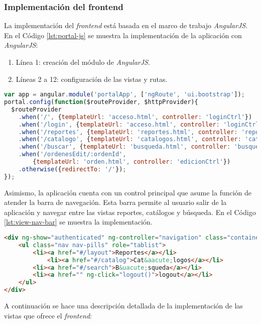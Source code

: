 \subsubsection{Implementación del frontend}\label{sec:frontend}
La implementación del \textit{frontend} está basada en el marco de trabajo \textit{AngularJS}. En el Código \ref{lst:portal-js} se muestra la implementación de la aplicación con \textit{AngularJS}:
\begin{enumerate}
	\item Línea 1: creación del módulo de \textit{AngularJS}.
	\item Líneas 2 a 12: configuración de las vistas y rutas.
\end{enumerate}
\begin{lstlisting}[language=Javascript, caption={Módulo de \textit{AngularJS} para el Portal Web.}, captionpos=b, label={lst:portal-js}]
var app = angular.module('portalApp', ['ngRoute', 'ui.bootstrap']);
portal.config(function($routeProvider, $httpProvider){
  $routeProvider
	.when('/', {templateUrl: 'acceso.html', controller: 'loginCtrl'})
	.when('/login', {templateUrl: 'acceso.html', controller: 'loginCtrl'})
	.when('/reportes', {templateUrl: 'reportes.html', controller: 'reportesCtrl'})
	.when('/catalogo', {templateUrl: 'catalogos.html', controller: 'catalogosCtrl'})
	.when('/buscar', {templateUrl: 'busqueda.html', controller: 'busquedaCtrl'})
	.when('/ordenesEdit/:ordenId',
		{templateUrl: 'orden.html', controller: 'edicionCtrl'})
	.otherwise({redirectTo: '/'});
});
\end{lstlisting}
Asimismo, la aplicación cuenta con un control principal que asume la función de atender la barra de navegación. Esta barra permite al usuario salir de la aplicación y navegar entre las vistas reportes, catálogos y búsqueda. En el Código \ref{lst:view-nav-bar} se muestra la implementación.
\begin{lstlisting}[language=HTML, captionpos=b, caption={Barra de navegación.}, label={lst:view-nav-bar}]
<div ng-show="authenticated" ng-controller="navigation" class="container">
	<ul class="nav nav-pills" role="tablist">
		<li><a href="#/layout">Reportes</a></li>
			<li><a href="#/catalog">Cat&aacute;logos</a></li> 
		<li><a href="#/search">B&uacute;squeda</a></li>
		<li><a href="" ng-click="logout()">logout</a></li>
	</ul>
</div>
\end{lstlisting}
A continuación se hace una descripción detallada de la implementación de las vistas que ofrece el \textit{frontend}:
